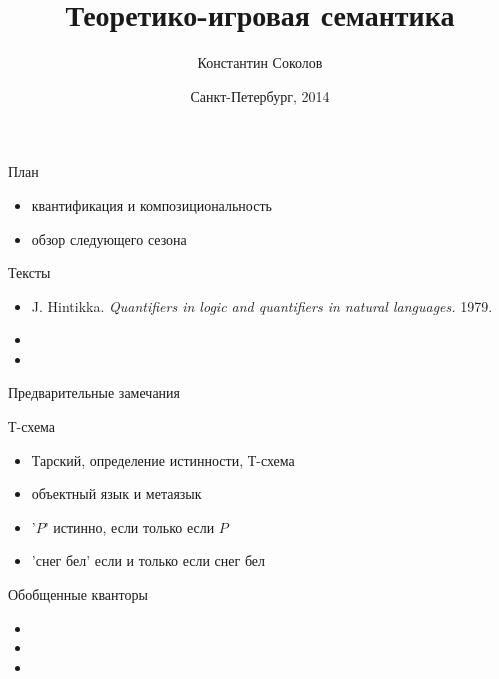 \documentclass{beamer}
\begin{document}
\title{\Large{Теоретико-игровая семантика}}
\author{Константин Соколов}
\date{Санкт-Петербург, 2014} 
\begin{frame}
    \thispagestyle{empty}
    \titlepage
\end{frame}

\begin{frame}{План}
\setcounter{framenumber}{1}
    \begin{itemize}
		\item квантификация и композициональность
		\item обзор следующего сезона
    \end{itemize}
\end{frame}

\begin{frame}{Тексты}
\begin{itemize}
	\item J. Hintikka. \textit{Quantifiers in logic and quantifiers in natural languages.} 1979.
	\item 
	\item 
\end{itemize}
\end{frame}

\begin{frame}{}
\begin{center}
Предварительные замечания
\end{center}
\end{frame}

\begin{frame}{Т-схема}
\begin{itemize}
	\item Тарский, определение истинности, Т-схема
	\item объектный язык и метаязык
	\item '$P$' истинно, если только если $P$
	\item 'снег бел' если и только если снег бел
\end{itemize}
\end{frame}

\begin{frame}{Обобщенные кванторы}
\begin{itemize}
	\item 
	\item 
	\item 
\end{itemize}
\end{frame}
\end{document}
